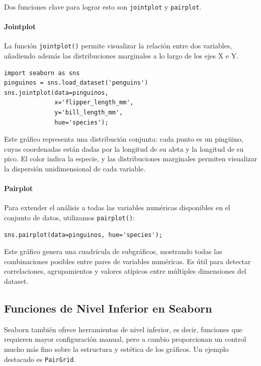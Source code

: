 \documentclass{article}
\theoremstyle{nonumberplain}
\begin{document}
Dos funciones clave para lograr esto son \texttt{jointplot} y \texttt{pairplot}.

\paragraph{Jointplot}

La función \texttt{jointplot()} permite visualizar la relación entre dos variables, añadiendo además las distribuciones marginales a lo largo de los ejes X e Y.

\begin{verbatim}
import seaborn as sns
pinguinos = sns.load_dataset('penguins')
sns.jointplot(data=pinguinos,
              x='flipper_length_mm',
              y='bill_length_mm',
              hue='species');
\end{verbatim}

Este gráfico representa una distribución conjunta: cada punto es un pingüino, cuyas coordenadas están dadas por la longitud de su aleta y la longitud de su pico. El color indica la especie, y las distribuciones marginales permiten visualizar la dispersión unidimensional de cada variable.

\paragraph{Pairplot}

Para extender el análisis a todas las variables numéricas disponibles en el conjunto de datos, utilizamos \texttt{pairplot()}:

\begin{verbatim}
sns.pairplot(data=pinguinos, hue='species');
\end{verbatim}

Este gráfico genera una cuadrícula de subgráficos, mostrando todas las combinaciones posibles entre pares de variables numéricas. Es útil para detectar correlaciones, agrupamientos y valores atípicos entre múltiples dimensiones del dataset.

\subsection*{Funciones de Nivel Inferior en Seaborn}

Seaborn también ofrece herramientas de nivel inferior, es decir, funciones que requieren mayor configuración manual, pero a cambio proporcionan un control mucho más fino sobre la estructura y estética de los gráficos. Un ejemplo destacado es \texttt{PairGrid}.
\end{document}
